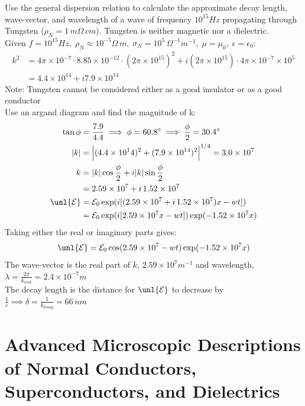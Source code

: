 \documentclass[a4paper, 11pt, normalem]{report}
\newcommand\E{\mathcal{E}}
\newcommand\uE{\unl{\E}}
\newcommand\eno{\epsilon_0}
\newcommand\e{\epsilon}
\newcommand\lam{\lambda}
\begin{document}
\begin{example}
Use the general dispersion relation to calculate the approximate decay length, wave-vector, and wavelength of a wave of frequency $10^{15}Hz$ propagating through Tungsten ($\rho_N = 1\,m\Omega\,cm$).
Tungsten is neither magnetic nor a dielectric. \\
Given $f = 10^{15}Hz,\;\rho_N \approx 10^{-5}\Omega\,m,\;\sigma_N = 10^5\,\Omega^{-1}m^{-1},\;\mu=\mu_0,\;\e=\eno$:
\begin{align}
    k^2 &= 4\pi\times10^{-7}\cdot8.85\times10^{-12}\cdot(2\pi\times10^{15})^2 + i(2\pi\times10^{15})\cdot4\pi\times10^{-7}\times10^5 \\
    &= 4.4\times10^{14} + i7.9\times10^{14}
\end{align}
Note: Tungsten cannot be considered either as a good insulator or as a good conductor \\
Use an argand diagram and find the magnitude of k:
\begin{align}
    \tan\phi &= \frac{7.9}{4.4} \implies \phi = 60.8^\circ \implies \frac{\phi}{2} = 30.4^\circ \\
    |k| &= \Big|(4.4\times10^14)^2 + (7.9\times10^{14})^2\Big|^{1/4} = 3.0\times10^7 \\
    k &= |k|\cos\frac{\phi}{2} + i|k|\sin\frac{\phi}{2} \\
    &= 2.59\times10^7 + i\,1.52\times10^7 \\
    \uE &= \E_0 \exp(i[(2.59\times10^7 + i\,1.52\times10^7)x - wt]) \\
    &= \E_0 \exp(i[2.59\times10^7x - wt])\exp(-1.52\times10^7x)
\end{align}
Taking either the real or imaginary parts gives:
\begin{equation}
    \uE = \E_0 \cos(2.59\times10^7 - wt)\exp(-1.52\times10^7x)
\end{equation}
The wave-vector is the real part of $k$, $2.59\times10^7m^{-1}$ and wavelength, $\lam = \frac{2\pi}{k_{real}} = 2.4\times10^{-7}m$ \\
The decay length is the distance for $\uE$ to decrease by $\frac{1}{e} \implies \delta = \frac{1}{k_{imag}} = 66\,nm$
\end{example}

\section{Advanced Microscopic Descriptions of Normal Conductors, Superconductors, and Dielectrics}
\end{document}
